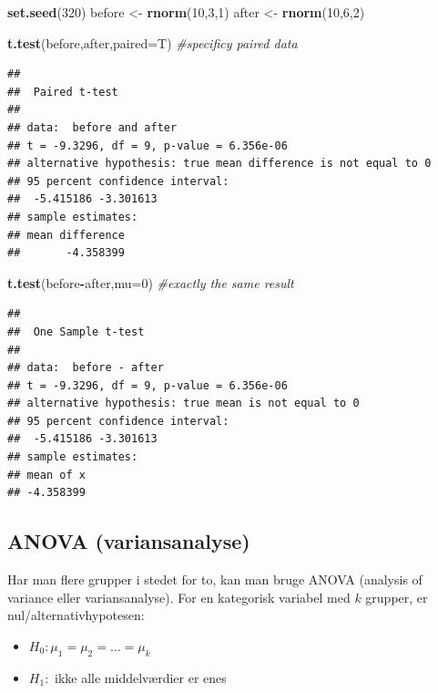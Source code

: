 \documentclass[
]{book}
\newenvironment{Shaded}{\begin{snugshade}}{\end{snugshade}}
\newcommand{\AttributeTok}[1]{\textcolor[rgb]{0.13,0.29,0.53}{#1}}
\newcommand{\CommentTok}[1]{\textcolor[rgb]{0.56,0.35,0.01}{\textit{#1}}}
\newcommand{\DecValTok}[1]{\textcolor[rgb]{0.00,0.00,0.81}{#1}}
\newcommand{\FunctionTok}[1]{\textcolor[rgb]{0.13,0.29,0.53}{\textbf{#1}}}
\newcommand{\NormalTok}[1]{#1}
\newcommand{\OtherTok}[1]{\textcolor[rgb]{0.56,0.35,0.01}{#1}}
\newcommand{\SpecialCharTok}[1]{\textcolor[rgb]{0.81,0.36,0.00}{\textbf{#1}}}
\providecommand{\tightlist}{%
  \setlength{\itemsep}{0pt}\setlength{\parskip}{0pt}}
\theoremstyle{definition}
\theoremstyle{definition}
\theoremstyle{definition}
\theoremstyle{definition}
\theoremstyle{remark}
\begin{document}
\begin{Shaded}
\begin{Highlighting}[]
\FunctionTok{set.seed}\NormalTok{(}\DecValTok{320}\NormalTok{)}
\NormalTok{before }\OtherTok{\textless{}{-}} \FunctionTok{rnorm}\NormalTok{(}\DecValTok{10}\NormalTok{,}\DecValTok{3}\NormalTok{,}\DecValTok{1}\NormalTok{)}
\NormalTok{after }\OtherTok{\textless{}{-}} \FunctionTok{rnorm}\NormalTok{(}\DecValTok{10}\NormalTok{,}\DecValTok{6}\NormalTok{,}\DecValTok{2}\NormalTok{)}

\FunctionTok{t.test}\NormalTok{(before,after,}\AttributeTok{paired=}\NormalTok{T) }\CommentTok{\#specificy paired data}
\end{Highlighting}
\end{Shaded}

\begin{verbatim}
## 
##  Paired t-test
## 
## data:  before and after
## t = -9.3296, df = 9, p-value = 6.356e-06
## alternative hypothesis: true mean difference is not equal to 0
## 95 percent confidence interval:
##  -5.415186 -3.301613
## sample estimates:
## mean difference 
##       -4.358399
\end{verbatim}

\begin{Shaded}
\begin{Highlighting}[]
\FunctionTok{t.test}\NormalTok{(before}\SpecialCharTok{{-}}\NormalTok{after,}\AttributeTok{mu=}\DecValTok{0}\NormalTok{) }\CommentTok{\#exactly the same result}
\end{Highlighting}
\end{Shaded}

\begin{verbatim}
## 
##  One Sample t-test
## 
## data:  before - after
## t = -9.3296, df = 9, p-value = 6.356e-06
## alternative hypothesis: true mean is not equal to 0
## 95 percent confidence interval:
##  -5.415186 -3.301613
## sample estimates:
## mean of x 
## -4.358399
\end{verbatim}

\subsection{ANOVA (variansanalyse)}\label{anova-variansanalyse}

Har man flere grupper i stedet for to, kan man bruge ANOVA (analysis of variance eller variansanalyse). For en kategorisk variabel med \(k\) grupper, er nul/alternativhypotesen:

\begin{itemize}
\tightlist
\item
  \(H_{0}: \mu_{1} = \mu_{2} = \ldots = \mu_{k}\)
\item
  \(H_{1}:\) ikke alle middelværdier er enes
\end{itemize}
\end{document}
